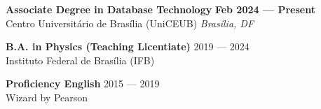 \justifying

\textbf{Associate Degree in Database Technology} \hfill \textbf{Feb 2024 --- Present} \\
Centro Universitário de Brasília (UniCEUB) \hfill \textit{Brasília, DF}
\vspace{0.6em}

\noindent
\textbf{B.A. in Physics (Teaching Licentiate)} \hfill 2019 --- 2024 \\
Instituto Federal de Brasília (IFB)
\vspace{0.6em}

\noindent
\textbf{Proficiency English} \hfill 2015 --- 2019 \\
Wizard by Pearson
\vspace{0.6em}